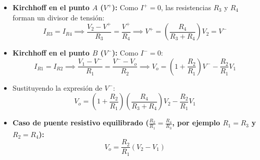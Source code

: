 \begin{center}
\end{center}

\begin{itemize}[leftmargin=*]
    \item \textbf{Kirchhoff en el punto $A$ ($V^+$):} Como $I^+ = 0$, las resistencias $R_3$ y $R_4$ forman un divisor de tensión:
    \begin{equation}
        I_{R3} = I_{R4} \implies \frac{V_2 - V^+}{R_3} = \frac{V^+}{R_4} \implies V^+ = \left(\frac{R_4}{R_3 + R_4}\right) V_2 = V^-
    \end{equation}
    \item \textbf{Kirchhoff en el punto $B$ ($V^-$):} Como $I^- = 0$:
    \begin{equation}
        I_{R1} = I_{R2} \implies \frac{V_1 - V^-}{R_1} = \frac{V^- - V_o}{R_2} \implies V_o = \left(1 + \frac{R_2}{R_1}\right) V^- - \frac{R_2}{R_1} V_1
    \end{equation}
    \item Sustituyendo la expresión de $V^-$:
    \begin{equation}
        \boxed{V_o = \left(1 + \frac{R_2}{R_1}\right)\left(\frac{R_4}{R_3 + R_4}\right) V_2 - \frac{R_2}{R_1} V_1}
    \end{equation}
    \item \textbf{Caso de puente resistivo equilibrado ($\frac{R_2}{R_1} = \frac{R_4}{R_3}$, por ejemplo $R_1 = R_3$ y $R_2 = R_4$):}
    \begin{equation}
        \boxed{V_o = \frac{R_2}{R_1} (V_2 - V_1)}
    \end{equation}
\end{itemize}

